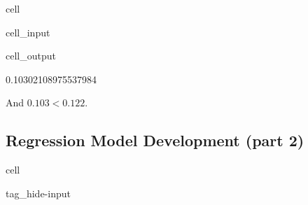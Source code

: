 \documentclass[letterpaper,10pt,english]{jupyterBook}
\begin{document}
\begin{sphinxuseclass}{cell}\begin{sphinxVerbatimInput}

\begin{sphinxuseclass}{cell_input}
\begin{sphinxVerbatim}[commandchars=\\\{\}]
    
 
  

 
\end{sphinxVerbatim}

\end{sphinxuseclass}\end{sphinxVerbatimInput}
\begin{sphinxVerbatimOutput}

\begin{sphinxuseclass}{cell_output}
\begin{sphinxVerbatim}[commandchars=\\\{\}]
0.10302108975537984
\end{sphinxVerbatim}

\end{sphinxuseclass}\end{sphinxVerbatimOutput}

\end{sphinxuseclass}
\sphinxAtStartPar
And \(0.103 < 0.122\).

\sphinxstepscope


\subsection{Regression Model Development (part 2)}
\label{\detokenize{task2_c/example_sup_reg/sup_reg_ex_develop-2:regression-model-development-part-2}}\label{\detokenize{task2_c/example_sup_reg/sup_reg_ex_develop-2:sup-reg-ex-develop-2}}\label{\detokenize{task2_c/example_sup_reg/sup_reg_ex_develop-2::doc}}
\begin{sphinxuseclass}{cell}
\begin{sphinxuseclass}{tag_hide-input}
\end{sphinxuseclass}
\end{sphinxuseclass}
\end{document}

